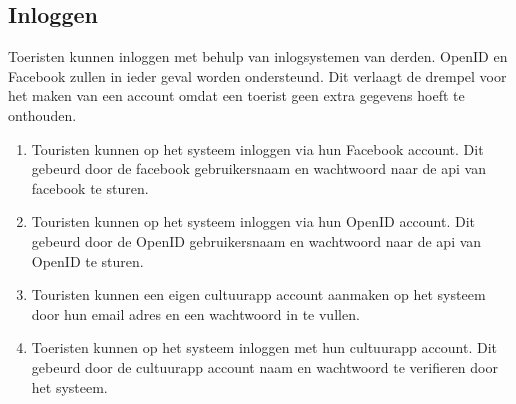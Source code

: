 \documentclass[a4paper,10pt]{article}
\begin{document}
            \subsection{Inloggen}
            Toeristen kunnen inloggen met behulp van inlogsystemen van derden. OpenID en Facebook zullen in ieder geval worden ondersteund. Dit verlaagt de drempel voor het maken van een account omdat een toerist geen extra gegevens hoeft te onthouden.
\begin{enumerate}
\item Touristen kunnen op het systeem inloggen via hun Facebook account. Dit gebeurd door de facebook gebruikersnaam en wachtwoord naar de api van facebook te sturen.
\item Touristen kunnen op het systeem inloggen via hun OpenID account. Dit gebeurd door de OpenID gebruikersnaam en wachtwoord naar de api van OpenID te sturen.
\item Touristen kunnen een eigen cultuurapp account aanmaken op het systeem door hun email adres en een wachtwoord in te vullen.
\item Toeristen kunnen op het systeem inloggen met hun cultuurapp account. Dit gebeurd door de cultuurapp account naam en wachtwoord te verifieren door het systeem.
\end{enumerate}
		
		\clearpage
\end{document}
